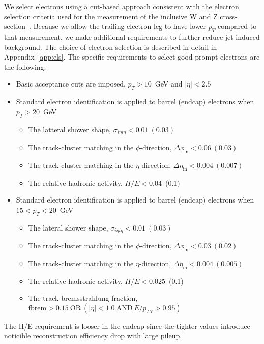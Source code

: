 We select electrons using a cut-based approach consistent with the electron 
selection criteria used for the measurement of the inclusive W and Z 
cross-section~\cite{VBTFCrossSectionNote}. 
Because we allow the trailing electron leg to have lower $p_T$ compared
to that measurement, we make additional requirements to further reduce
jet induced background.
The choice of electron selection is described in detail in Appendix~\ref{app:els}.
The specific requirements to select good prompt electrons are the following:

\begin{itemize}
    \item Basic acceptance cuts are imposed,  $p_T>10$~GeV and $|\eta| < 2.5$
    \item Standard electron identification is applied to barrel (endcap) electrons when $p_T>20$~GeV
    \begin{itemize}
        \item The latteral shower shape, $\sigma_{i\eta i\eta} < 0.01~(0.03)$
        \item The track-cluster matching in the $\phi$-direction, $\Delta \phi_{\mathrm{in}} < 0.06~(0.03)$
        \item The track-cluster matching in the $\eta$-direction, $\Delta \eta_{\mathrm{in}} < 0.004~(0.007)$
        \item The relative hadronic activity, $H/E<0.04$~(0.1)
    \end{itemize}
    \item Standard electron identification is applied to barrel (endcap) electrons when $15<p_T<20$~GeV
    \begin{itemize}
        \item The lateral shower shape, $\sigma_{i\eta i\eta} < 0.01~(0.03)$
        \item The track-cluster matching in the $\phi$-direction, $\Delta \phi_{\mathrm{in}} < 0.03~(0.02)$
        \item The track-cluster matching in the $\eta$-direction, $\Delta \eta_{\mathrm{in}} < 0.004~(0.005)$
        \item The relative hadronic activity, $H/E<0.025$~(0.1)
        \item The track bremsstrahlung fraction, $\mathrm{fbrem}>0.15~\mathrm{OR}~(|\eta|<1.0~\mathrm{AND}~E/p_{IN}>0.95)$
    \end{itemize}
\end{itemize}

The H/E requirement is looser in the endcap since the tighter values
introduce noticible reconstruction efficiency drop with large pileup.

